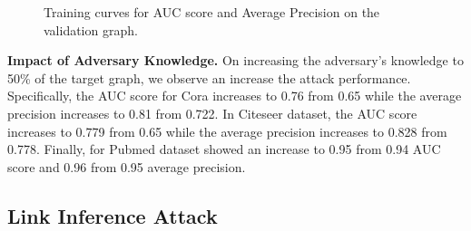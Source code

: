 \begin{figure}[!htb]
    \centering
    \begin{minipage}[b]{1\linewidth}
    \centering
    \end{minipage}
\vspace{-3mm}
    \caption{Training curves for AUC score and Average Precision on the validation graph.}
    \label{fig:valgraphrecon}
\vspace{-1mm}
\end{figure}

\noindent\textbf{Impact of Adversary Knowledge.} On increasing the adversary's knowledge to 50\% of the target graph, we observe an increase the attack performance.
Specifically, the AUC score for Cora increases to 0.76 from 0.65 while the average precision increases to 0.81 from 0.722.
In Citeseer dataset, the AUC score increases to 0.779 from 0.65 while the average precision increases to 0.828 from 0.778.
Finally, for Pubmed dataset showed an increase to 0.95 from 0.94 AUC score and 0.96 from 0.95 average precision.



\subsection{Link Inference Attack}

